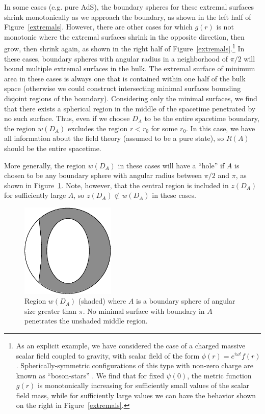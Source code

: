 \documentclass[12pt]{article}
\renewcommand{\(}{\left(}
\renewcommand{\)}{\right)}
\begin{document}
In some cases (e.g. pure AdS), the boundary spheres for these extremal surfaces shrink monotonically as we approach the boundary, as shown in the left half of Figure~\ref{extremals}. However, there are other cases for which $g(r)$ is not monotonic where the extremal surfaces shrink in the opposite direction, then grow, then shrink again, as shown in the right half of Figure~\ref{extremals}.\footnote{As an explicit example, we have considered the case of a charged massive scalar field coupled to gravity, with scalar field of the form $\phi(r) = e^{i \omega t} f(r)$. Spherically-symmetric configurations of this type with non-zero charge are known as ``boson-stars'' \cite{Astefanesei:2003qy}. We find that for fixed $\psi(0)$, the metric function $g(r)$ is monotonically increasing for sufficiently small values of the scalar field mass, while for sufficiently large values we can have the behavior shown on the right in Figure~\ref{extremals}.} In these cases, boundary spheres with angular radius in a neighborhood of $\pi/2$ will bound multiple extremal surfaces in the bulk. The extremal surface of minimum area in these cases is always one that is contained within one half of the bulk space (otherwise we could construct intersecting minimal surfaces bounding disjoint regions of the boundary). Considering only the minimal surfaces, we find that there exists a spherical region in the middle of the spacetime penetrated by no such surface. Thus, even if we choose $D_A$ to be the entire spacetime boundary, the region $w(D_A)$ excludes the region $r<r_0$ for some $r_0$. In this case, we have all information about the field theory (assumed to be a pure state), so $R(A)$ should be the entire spacetime.

More generally, the region $w(D_A)$ in these cases will have a ``hole'' if $A$ is chosen to be any boundary sphere with angular radius between $\pi/2$ and $\pi$, as shown in Figure~\ref{hole}. Note, however, that the central region is included in $z(D_A)$ for sufficiently large $A$, so $z(D_A) \not\subset w(D_A)$ in these cases.


\begin{figure}
\centering
\includegraphics[width=0.4\textwidth]{geodesics2.eps}
\caption{Region $w(D_A)$ (shaded) where $A$ is a boundary sphere of angular size greater than $\pi$. No minimal surface with boundary in $A$ penetrates the unshaded middle region.}
\label{hole}
\end{figure}
\end{document}
